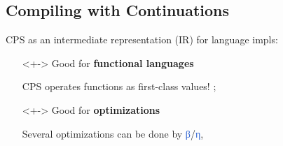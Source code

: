 \subsection{Compiling with Continuations}
\begin{frame}[fragile]
	\frametitlesubs

	CPS as \textcolor{subhighlight}{an intermediate representation} (IR) for language impls\cite{appel1992cwc}:

	\begin{center}
	\end{center}

	\pause
	\begin{itemize}
		\item[\emoji{check-mark-button}]<+->
		      Good for \textcolor{subhighlight}{\bf functional languages}

		      \smaller
		      CPS operates functions as first-class values!
		      ;

		\item[\emoji{check-mark-button}]<+->
		      Good for \textcolor{subhighlight}{\bf optimizations}

		      \smaller
		      Several optimizations can be done by \textcolor{highlight}{β}/\textcolor{highlight}{η},


\end{itemize}
\end{frame}
